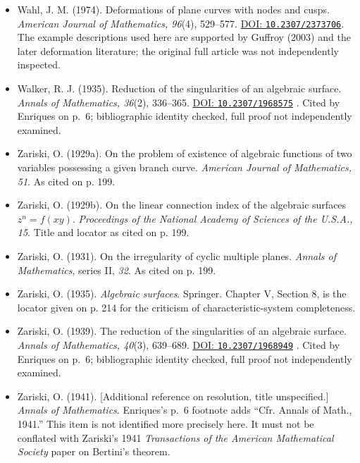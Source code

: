\begin{sloppypar}
\begin{itemize}
\item Wahl, J. M. (1974). Deformations of plane curves with nodes and cusps. \emph{American Journal of Mathematics, 96}(4), 529--577. \href{https://doi.org/10.2307/2373706}{DOI: \nolinkurl{10.2307/2373706}}. The example descriptions used here are supported by Guffroy (2003) and the later deformation literature; the original full article was not independently inspected.

\item Walker, R. J. (1935). Reduction of the singularities of an algebraic surface. \emph{Annals of Mathematics, 36}(2), 336--365. \href{https://doi.org/10.2307/1968575}{DOI: \nolinkurl{10.2307/1968575}} . Cited by Enriques on p.~6; bibliographic identity checked, full proof not independently examined.

\item Zariski, O. (1929a). On the problem of existence of algebraic functions of two variables possessing a given branch curve. \emph{American Journal of Mathematics, 51}. As cited on p. 199.

\item Zariski, O. (1929b). On the linear connection index of the algebraic surfaces $z^n=f(xy)$. \emph{Proceedings of the National Academy of Sciences of the U.S.A., 15}. Title and locator as cited on p. 199.

\item Zariski, O. (1931). On the irregularity of cyclic multiple planes. \emph{Annals of Mathematics}, series II, \emph{32}. As cited on p. 199.

\item Zariski, O. (1935). \emph{Algebraic surfaces}. Springer. Chapter V, Section 8, is the locator given on p. 214 for the criticism of characteristic-system completeness.

\item Zariski, O. (1939). The reduction of the singularities of an algebraic surface. \emph{Annals of Mathematics, 40}(3), 639--689. \href{https://doi.org/10.2307/1968949}{DOI: \nolinkurl{10.2307/1968949}} . Cited by Enriques on p.~6; bibliographic identity checked, full proof not independently examined.

\item Zariski, O. (1941). [Additional reference on resolution, title unspecified.] \emph{Annals of Mathematics}. Enriques's p.~6 footnote adds ``Cfr. Annals of Math., 1941.'' This item is not identified more precisely here. It must not be conflated with Zariski's 1941 \emph{Transactions of the American Mathematical Society} paper on Bertini's theorem.


\end{itemize}
\end{sloppypar}
